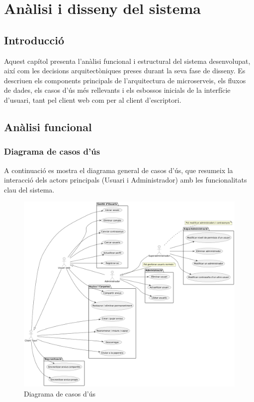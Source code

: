 \chapter{An\`alisi i disseny del sistema}
\label{chap:analisi_disseny}

\section{Introducci\'o}
Aquest cap\'itol presenta l'an\`alisi funcional i estructural del sistema desenvolupat, aix\'i com les decisions arquitect\`oniques preses durant la seva fase de disseny. Es descriuen els components principals de l'arquitectura de microserveis, els fluxos de dades, els casos d'\'us m\'es rellevants i els esbossos inicials de la interf\'icie d'usuari, tant pel client web com per al client d'escriptori.

\section{An\`alisi funcional}

\subsection{Diagrama de casos d'ús}
A continuació es mostra el diagrama general de casos d'ús, que resumeix la interacció dels actors principals (Usuari i Administrador) amb les funcionalitats clau del sistema.

\begin{figure}[H]
\centering
\includegraphics[width=\textwidth]{Figures/use_case_diagram.png}
\caption{Diagrama de casos d'ús}
\end{figure}

